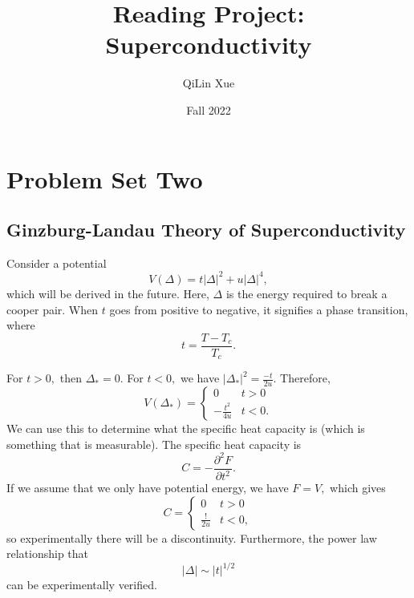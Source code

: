 \documentclass{article}
\title{Reading Project: Superconductivity}
\author{QiLin Xue}
\date{Fall 2022}
\numberwithin{equation}{section}
\begin{document}
\maketitle
\tableofcontents
\newpage
\section{Problem Set Two}
\subsection{Ginzburg-Landau Theory of Superconductivity}
Consider a potential 
\begin{equation}
    V(\Delta) = t|\Delta|^2 + u|\Delta|^4,
\end{equation}
which will be derived in the future. Here, $\Delta$ is the energy required to break a cooper pair. When $t$ goes from positive to negative, it signifies a phase transition, where
\begin{equation*}
    t = \frac{T-T_c}{T_c}.
\end{equation*}
\begin{center}
\end{center}
For $t>0,$ then $\Delta_* =0.$ For $t<0,$ we have $|\Delta_*|^2 = \frac{-t}{2u}.$ Therefore,
\begin{equation*}
    V(\Delta_*) = \begin{cases}
        0 & t>0 \\ 
        -\frac{t^2}{4u} & t<0.
    \end{cases}
\end{equation*}
We can use this to determine what the specific heat capacity is (which is something that is measurable). The specific heat capacity is 
\begin{equation*}
    C = -\frac{\partial^2 F}{\partial t^2}.
\end{equation*}
If we assume that we only have potential energy, we have $F = V,$ which gives 
\begin{equation*}
    C = \begin{cases}
        0 & t>0 \\ 
        \frac{!}{2u} & t< 0,
    \end{cases}
\end{equation*}
so experimentally there will be a discontinuity. Furthermore, the power law relationship that 
\begin{equation*}
    |\Delta| \sim |t|^{1/2}
\end{equation*}
can be experimentally verified.
\end{document}

